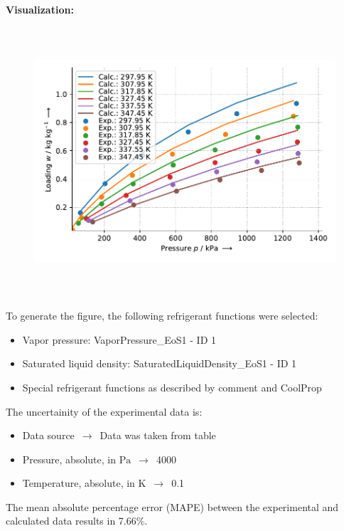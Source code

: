 \textbf{Visualization:}
%
\begin{figure}[!htp]
{\noindent\includegraphics[height=10cm, keepaspectratio]{figs/ads/ads_R-32_activated_carbon_fiber_A-20_DubininAstakhov_1.pdf}}
\end{figure}
%

To generate the figure, the following refrigerant functions were selected:
\begin{itemize}
\item Vapor pressure: VaporPressure\_EoS1 - ID 1
\item Saturated liquid density: SaturatedLiquidDensity\_EoS1 - ID 1
\item Special refrigerant functions as described by comment and CoolProp
\end{itemize}

The uncertainity of the experimental data is:
\begin{itemize}
\item Data source $\,\to\,$ Data was taken from table
\item Pressure, absolute, in $\si{\pascal}$ $\,\to\,$ 4000
\item Temperature, absolute, in $\si{\kelvin}$ $\,\to\,$ 0.1
\end{itemize}

The mean absolute percentage error (MAPE) between the experimental and calculated data results in 7.66\%.
\FloatBarrier
\newpage
